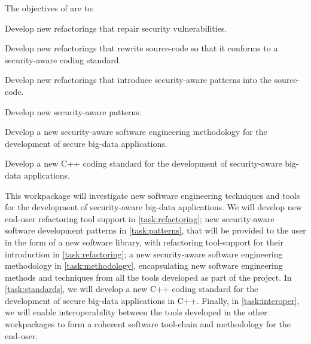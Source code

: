 \addtocounter{wpno}{1}
\begin{Workpackage}{\thewpno}
\WPTitle{\wpname{\thewpno}}



\begin{WPObjectives}
The objectives of \theWP{} are to:
\begin{compactitem}
\item Develop new refactorings that repair security vulnerabilities.
\item Develop new refactorings that rewrite source-code so that it conforms to a security-aware coding standard.
\item Develop new refactorings that introduce security-aware patterns into the source-code.
\item Develop new security-aware patterns.
\item Develop a new security-aware software engineering methodology for the development of secure big-data applications.
\item Develop a new C++ coding standard for the development of security-aware big-data applications.


\end{compactitem}
\end{WPObjectives}

\begin{WPDescription}
This workpackage will investigate new software engineering techniques and tools for the development of security-aware big-data applications. We will develop new end-user refactoring tool support in \ref{task:refactoring}; new security-aware software development patterns in \ref{task:patterns}, that will be provided to the user in the form of a new software library, with refactoring tool-support for their introduction in \ref{task:refactoring}; a new security-aware software engineering methodology in \ref{task:methodology}, encapsulating new software engineering methods and techniques from all the tools developed as part of the \TheProject{} project. In \ref{task:standards}, we will develop a new C++ coding standard for the development of secure big-data applications in C++. Finally, in \ref{task:interoper}, we will enable interoperability between the tools developed in the other workpackages to form a coherent software tool-chain and methodology for the end-user.



\end{WPDescription}
\end{Workpackage}
